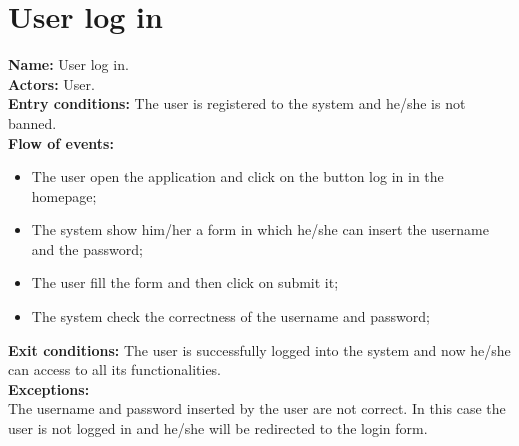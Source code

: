 \section*{User log in} 
\textbf{Name:} User log in.\\
\textbf{Actors:} User.\\
\textbf{Entry conditions:} The user is registered to the system and he/she is not banned.\\
\textbf{Flow of events:}
\begin{itemize}
\item The user open the application and click on the button log in in the homepage;
\item The system show him/her a form in which he/she can insert the username and the password;
\item The user fill the form and then click on submit it;
\item The system check the correctness of the username and password;
\end{itemize}
\textbf{Exit conditions:} The user is successfully logged into the system and now he/she can access to all its functionalities. \\
\textbf{Exceptions:} \\
The username and password inserted by the user are not correct. In this case the user is not logged in and he/she will be redirected to the login form.

